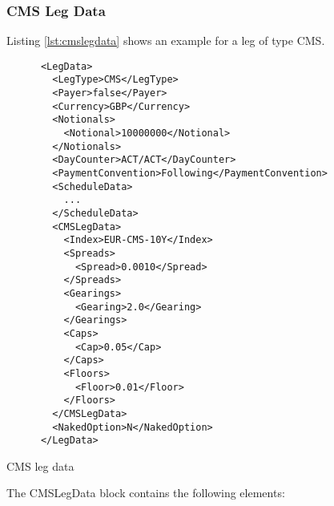 \subsubsection{CMS Leg Data}
\label{ss:cmslegdata}

Listing \ref{lst:cmslegdata} shows an example for a leg of type CMS. 

\begin{listing}[H]
\begin{verbatim}
      <LegData>
        <LegType>CMS</LegType>
        <Payer>false</Payer>
        <Currency>GBP</Currency>
        <Notionals>
          <Notional>10000000</Notional>
        </Notionals>
        <DayCounter>ACT/ACT</DayCounter>
        <PaymentConvention>Following</PaymentConvention>
        <ScheduleData>
          ...
        </ScheduleData>
        <CMSLegData>
          <Index>EUR-CMS-10Y</Index>
          <Spreads>
            <Spread>0.0010</Spread>
          </Spreads>
          <Gearings>
            <Gearing>2.0</Gearing>
          </Gearings>
          <Caps>
            <Cap>0.05</Cap>
          </Caps>
          <Floors>
            <Floor>0.01</Floor>
          </Floors>
        </CMSLegData>
        <NakedOption>N</NakedOption>
      </LegData>
\end{verbatim}
\caption{CMS leg data}
\label{lst:cmslegdata}
\end{listing}

The CMSLegData block contains the following elements:

